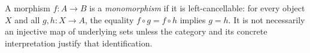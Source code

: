 
A morphism $f:A\to B$ is a \emph{monomorphism} if it is left-cancellable: for every object $X$ and all $g,h:X\to A$, the equality $f\circ g=f\circ h$ implies $g=h$. It is not necessarily an injective map of underlying sets unless the category and its concrete interpretation justify that identification.
